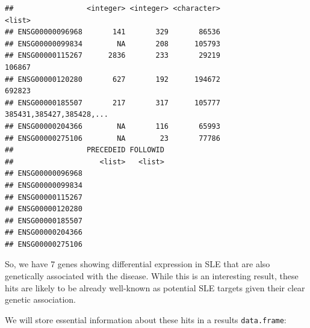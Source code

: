 \documentclass[9pt,a4paper,]{extarticle}
\newenvironment{Shaded}{\begin{snugshade}}{\end{snugshade}}
\newcommand{\KeywordTok}[1]{\textcolor[rgb]{0.13,0.29,0.53}{\textbf{#1}}}
\newcommand{\DataTypeTok}[1]{\textcolor[rgb]{0.13,0.29,0.53}{#1}}
\newcommand{\StringTok}[1]{\textcolor[rgb]{0.31,0.60,0.02}{#1}}
\newcommand{\OperatorTok}[1]{\textcolor[rgb]{0.81,0.36,0.00}{\textbf{#1}}}
\newcommand{\NormalTok}[1]{#1}
\begin{document}
\begin{verbatim}
##                 <integer> <integer> <character>                   <list>
## ENSG00000096968       141       329       86536                         
## ENSG00000099834        NA       208      105793                         
## ENSG00000115267      2836       233       29219                   106867
## ENSG00000120280       627       192      194672                   692823
## ENSG00000185507       217       317      105777 385431,385427,385428,...
## ENSG00000204366        NA       116       65993                         
## ENSG00000275106        NA        23       77786                         
##                 PRECEDEID FOLLOWID
##                    <list>   <list>
## ENSG00000096968                   
## ENSG00000099834                   
## ENSG00000115267                   
## ENSG00000120280                   
## ENSG00000185507                   
## ENSG00000204366                   
## ENSG00000275106
\end{verbatim}

So, we have 7 genes showing differential expression in SLE that are also genetically associated with the disease.
While this is an interesting result, these hits are likely to be already well-known as potential SLE targets given their clear genetic association.

We will store essential information about these hits in a results \texttt{data.frame}:

\begin{Shaded}
\end{Shaded}
\end{document}
